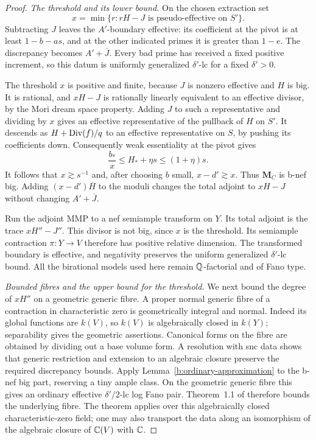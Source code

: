\begin{proof}
\emph{The threshold and its lower bound.}
On the chosen extraction set
\[
 x=\min\{r:rH-J\text{ is pseudo-effective on }S'\}.
\]
Subtracting $J$ leaves the $A'$-boundary effective: its coefficient at
the pivot is at least $1-b-as$, and at the other indicated primes it
is greater than $1-e$.  The discrepancy becomes $A'+\overline J$.
Every bad prime has received a fixed positive increment, so this datum
is uniformly generalized $\delta'$-lc for a fixed $\delta'>0$.

The threshold $x$ is positive and finite, because $J$ is nonzero
effective and $H$ is big.  It is rational, and $xH-J$ is rationally
linearly equivalent to an effective divisor, by the Mori dream space
property.  Adding $J$ to such a representative and dividing by $x$
gives an effective representative of the pullback of $H$ on $S'$.
It descends as $H+\operatorname{Div}(f)/q$ to an effective representative on $S$,
by pushing its coefficients down.  Consequently weak essentiality at
the pivot gives
\begin{equation}\label{b:scale-pivot-lower}
                  \frac{b_*}{x}\le H_*+\eta s\le(1+\eta)s.
\end{equation}
It follows that $x\gtrsim s^{-1}$ and, after choosing $b$ small,
$x-d'\gtrsim x$.  Thus $\mathbf M_C$ is b-nef big.
Adding $(x-d')\overline H$ to the moduli changes the total adjoint to
$xH-J$ without changing $A'+\overline J$.

Run the adjoint MMP to a nef semiample transform on $Y$.  Its total
adjoint is the trace $xH''-J''$.  This divisor is not big, since $x$ is
the threshold.  Its semiample contraction $\pi:Y\to V$ therefore has
positive relative dimension.  The transformed boundary is effective,
and negativity preserves the uniform generalized $\delta'$-lc bound.
All the birational models used here remain $\mathbb Q$-factorial and of Fano
type.

\smallskip\noindent
\emph{Bounded fibres and the upper bound for the threshold.}
We next bound the degree of $xH''$ on a geometric generic fibre. A proper
normal generic fibre of a contraction in characteristic zero is
geometrically integral and normal.  Indeed its global functions are
$k(V)$, so $k(V)$ is algebraically closed in $k(Y)$; separability gives
the geometric assertions.  Canonical forms on the fibre are obtained
by dividing out a base volume form.  A resolution with snc data shows
that generic restriction and extension to an algebraic closure preserve
the required discrepancy bounds.  Apply
Lemma~\ref{b:ordinary-approximation} to the b-nef big part, reserving a
tiny ample class.  On the geometric generic fibre this gives an ordinary
effective $\delta'/2$-lc log Fano pair.  Theorem~1.1 of
\cite{BirkarBAB} therefore bounds the underlying fibre.  The theorem
applies over this algebraically closed characteristic-zero field; one
may also transport the data along an isomorphism of the algebraic
closure of $\mathbb C(V)$ with $\mathbb C$.


\end{proof}
